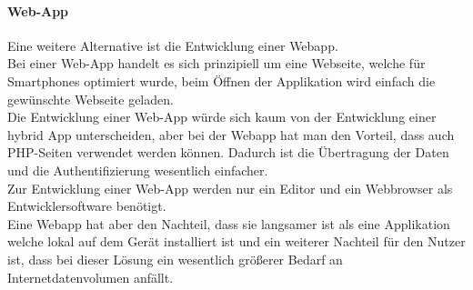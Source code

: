 \paragraph*{Web-App\\}

Eine weitere Alternative ist die Entwicklung einer Webapp.\\
Bei einer Web-App handelt es sich prinzipiell um eine Webseite, welche für Smartphones optimiert wurde, beim Öffnen der Applikation wird einfach die gewünschte Webseite geladen.\\
Die Entwicklung einer Web-App würde sich kaum von der Entwicklung einer hybrid App unterscheiden, aber bei der Webapp hat man den Vorteil, dass auch PHP-Seiten verwendet werden können. Dadurch ist die Übertragung der Daten und die Authentifizierung wesentlich einfacher.\\
Zur Entwicklung einer Web-App werden nur ein Editor und ein Webbrowser als Entwicklersoftware benötigt.\\
Eine Webapp hat aber den Nachteil, dass sie langsamer ist als eine Applikation welche lokal auf dem Gerät installiert ist und ein weiterer Nachteil für den Nutzer ist, dass bei dieser Lösung ein wesentlich größerer Bedarf an Internetdatenvolumen anfällt.\\
